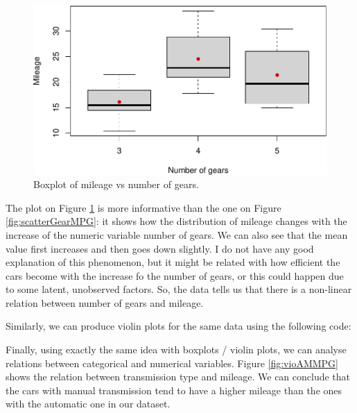 \documentclass[
]{book}
\newenvironment{Shaded}{\begin{snugshade}}{\end{snugshade}}
\newcommand{\AttributeTok}[1]{\textcolor[rgb]{0.13,0.29,0.53}{#1}}
\newcommand{\DecValTok}[1]{\textcolor[rgb]{0.00,0.00,0.81}{#1}}
\newcommand{\FunctionTok}[1]{\textcolor[rgb]{0.13,0.29,0.53}{\textbf{#1}}}
\newcommand{\NormalTok}[1]{#1}
\newcommand{\SpecialCharTok}[1]{\textcolor[rgb]{0.81,0.36,0.00}{\textbf{#1}}}
\newcommand{\StringTok}[1]{\textcolor[rgb]{0.31,0.60,0.02}{#1}}
\theoremstyle{definition}
\theoremstyle{definition}
\theoremstyle{definition}
\theoremstyle{definition}
\theoremstyle{remark}
\begin{document}
\begin{figure}
\centering
\includegraphics{Svetunkov---Statistics-for-Business-Analytics_files/figure-latex/boxGearMPG-1.pdf}
\caption{\label{fig:boxGearMPG}Boxplot of mileage vs number of gears.}
\end{figure}

The plot on Figure \ref{fig:boxGearMPG} is more informative than the one on Figure \ref{fig:scatterGearMPG}: it shows how the distribution of mileage changes with the increase of the numeric variable number of gears. We can also see that the mean value first increases and then goes down slightly. I do not have any good explanation of this phenomenon, but it might be related with how efficient the cars become with the increase fo the number of gears, or this could happen due to some latent, unobserved factors. So, the data tells us that there is a non-linear relation between number of gears and mileage.

Similarly, we can produce violin plots for the same data using the following code:

\begin{Shaded}
\end{Shaded}

Finally, using exactly the same idea with boxplots / violin plots, we can analyse relations between categorical and numerical variables. Figure \ref{fig:vioAMMPG} shows the relation between transmission type and mileage. We can conclude that the cars with manual transmission tend to have a higher mileage than the ones with the automatic one in our dataset.
\end{document}
